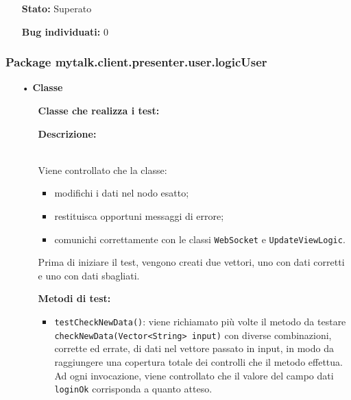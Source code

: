 {\begin{sloppypar}
{{\begin{itemize}
\begin{itemize}
\begin{itemize}
						\item \texttt{testDeleteCookies()}: viene creato un cookie\g~ tramite il metodo \texttt{createSessionCookie(String name, String, content)} e ne viene verificata la corretta creazione utilizzando il metodo \texttt{getCookie(String name)}, entrambi offerti dalla classe \texttt{Cookies} di \texttt{GWT}. Successivamente, viene richiamato il metodo  \texttt{deleteCookies()} della classe \texttt{ManageCookies} per eliminare il cookie\g~ creato e ne viene verificata l’effettiva eliminazione controllando che il metodo \texttt{getCookie(String name)} ritorni un riferimento nullo.
					\end{itemize}
					\item[] \textbf{Stato:} {Superato}

					\item[] \textbf{Bug individuati:} {0}
				\end{itemize}	
			\end{itemize}
		}
			
		\subsubsection{Package mytalk.client.presenter.user.logicUser}{
			\begin{itemize}
				\item[•]\textbf{Classe }
				\begin{itemize}
					\item[] \textbf{Classe che realizza i test:}	\\ 

					\item[] \textbf{Descrizione:} {\\Viene controllato che la classe:
						\begin{itemize}
							\item modifichi i dati nel nodo esatto;
							\item restituisca opportuni messaggi di errore;
							\item comunichi correttamente con le classi \texttt{WebSocket} e \texttt{UpdateViewLogic}.
						\end{itemize}
						Prima di iniziare il test, vengono creati due vettori, uno con dati corretti e uno con dati sbagliati.
					}
					\item[] \textbf{Metodi di test:}
					\begin{itemize}
						\item \texttt{testCheckNewData()}: viene richiamato più volte il metodo da testare \texttt{checkNewData(Vector<String> input)} con diverse combinazioni, corrette ed errate, di dati nel vettore passato in input, in modo da raggiungere una copertura totale dei controlli che il metodo effettua. Ad ogni invocazione, viene controllato che il valore del campo dati \texttt{loginOk} corrisponda a quanto atteso.
						

\end{itemize}
\end{itemize}
\end{itemize}}}
\end{sloppypar}}
